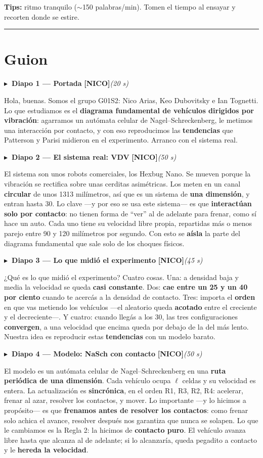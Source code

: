 \documentclass[11pt,a4paper]{article}
\newcommand{\diapo}[5]{%
  \medskip\par\noindent
  \textcolor{#4}{\textbf{$\blacktriangleright$\ Diapo #1 --- #2}}\quad
  \textcolor{#4}{\textbf{[#3]}}\hfill{\itshape\small(#5)}\par\nobreak\smallskip
}
\begin{document}
\textbf{Tips:} ritmo tranquilo ($\sim$150 palabras/min). Tomen el tiempo al ensayar y recorten donde se estire.

\vspace{4pt}
\hrule
\vspace{4pt}

\section*{Guion}

\diapo{1}{Portada}{NICO}{cnico}{20 s}
Hola, buenas. Somos el grupo G01S2: Nico Arias, Keo Dubovitsky e Ian Tognetti. Lo que estudiamos es el
\textbf{diagrama fundamental de vehículos dirigidos por vibración}: agarramos un autómata celular de
Nagel--Schreckenberg, le metimos una interacción por contacto, y con eso reproducimos las \textbf{tendencias}
que Patterson y Parisi midieron en el experimento. Arranco con el sistema real.

\diapo{2}{El sistema real: VDV}{NICO}{cnico}{50 s}
El sistema son unos robots comerciales, los Hexbug Nano. Se mueven porque la vibración se rectifica sobre unas
cerditas asimétricas. Los meten en un canal \textbf{circular} de unos 1313 milímetros, así que es un sistema de
\textbf{una dimensión}, y entran hasta 30. Lo clave ---y por eso se usa este sistema--- es que
\textbf{interactúan solo por contacto}: no tienen forma de ``ver'' al de adelante para frenar, como sí hace un
auto. Cada uno tiene su velocidad libre propia, repartidas más o menos parejo entre 90 y 120 milímetros por
segundo. Con esto se \textbf{aísla} la parte del diagrama fundamental que sale solo de los choques físicos.

\diapo{3}{Lo que midió el experimento}{NICO}{cnico}{45 s}
¿Qué es lo que midió el experimento? Cuatro cosas. Una: a densidad baja y media la velocidad se queda
\textbf{casi constante}. Dos: \textbf{cae entre un 25 y un 40 por ciento} cuando te acercás a la densidad de
contacto. Tres: importa el \textbf{orden} en que vas metiendo los vehículos ---el aleatorio queda \textbf{acotado}
entre el creciente y el decreciente---. Y cuatro: cuando llegás a los 30, las tres configuraciones
\textbf{convergen}, a una velocidad que encima queda por debajo de la del más lento. Nuestra idea es reproducir
estas \textbf{tendencias} con un modelo barato.

\diapo{4}{Modelo: NaSch con contacto}{NICO}{cnico}{50 s}
El modelo es un autómata celular de Nagel--Schreckenberg en una \textbf{ruta periódica de una dimensión}. Cada
vehículo ocupa $\ell$ celdas y su velocidad es entera. La actualización es \textbf{sincrónica}, en el orden R1,
R3, R2, R4: acelerar, frenar al azar, resolver los contactos, y mover. Lo importante ---y lo hicimos a
propósito--- es que \textbf{frenamos antes de resolver los contactos}: como frenar solo achica el avance,
resolver después nos garantiza que nunca se solapen. Lo que le cambiamos es la Regla 2: la hicimos de
\textbf{contacto puro}. El vehículo avanza libre hasta que alcanza al de adelante; si lo alcanzaría, queda
pegadito a contacto y le \textbf{hereda la velocidad}.
\end{document}
